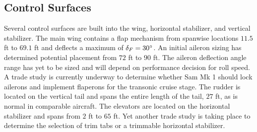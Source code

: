 \subsection{Control Surfaces}
Several control surfaces are built into the wing, horizontal stabilizer, and vertical stabilizer.  The main wing contains a flap mechanism from spanwise locations $11.5$ ft to $69.1$ ft and deflects a maximum of $\delta_F = 30\degree$.  An initial aileron sizing has determined potential placement from $72$ ft to $90$ ft.  The aileron deflection angle range has yet to be sized and will depend on performance decision for roll speed.  A trade study is currently underway to determine whether Sam Mk 1 should lock ailerons and implement flaperons for the transonic cruise stage.  The rudder is located on the vertical tail and spans the entire length of the tail, $27$ ft, as is normal in comparable aircraft.  The elevators are located on the horizontal stabilizer and spans from $2$ ft to $65$ ft.  Yet another trade study is taking place to determine the selection of trim tabs or a trimmable horizontal stabilizer.










